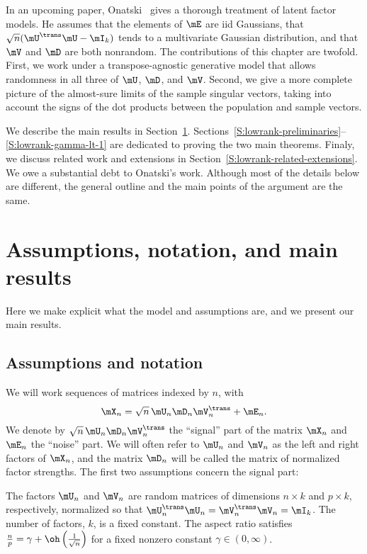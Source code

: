 In an upcoming paper, Onatski~\cite{onatski2009} gives a thorough
treatment of latent factor models. He assumes that the elements of $\mE$ are iid
Gaussians, that $\sqrt{n} ( \mU^\trans \mU - \mI_k) $ tends to a multivariate
Gaussian distribution, and that $\mV$ and $\mD$ are both nonrandom. The
contributions of this chapter are twofold. First, we work under a
transpose-agnostic generative model that allows randomness in all three of
$\mU$, $\mD$, and $\mV$. Second, we give a more complete picture of the
almost-sure limits of the sample singular vectors, taking into account the
signs of the dot products between the population and sample vectors.

We describe the main results in Section~\ref{S:lowrank-assumptions-results}.
Sections~\ref{S:lowrank-preliminaries}--\ref{S:lowrank-gamma-lt-1} are dedicated to proving the two main theorems.  Finaly, we discuss related work and extensions in Section~\ref{S:lowrank-related-extensions}.  We owe a substantial debt to Onatski's work.  Although most of the details below are different, the general outline and the main points of the argument are the same.

\section{Assumptions, notation, and main results}\label{S:lowrank-assumptions-results}

Here we make explicit what the model and assumptions are, and we present our
main results.

\subsection{Assumptions and notation}

We will work sequences of matrices indexed by $n$, with
\begin{equation}
    \mX_n = \sqrt{n} \, \mU_n \mD_n \mV_n^\trans + \mE_n.
\end{equation}
We denote by $\sqrt{n} \, \mU_n \mD_n \mV_n^\trans$ the ``signal'' part of the
matrix $\mX_n$ and $\mE_n$ the ``noise'' part. We will often refer to $\mU_n$
and $\mV_n$ as the left and right factors of $\mX_n$, and the matrix $\mD_n$
will be called the matrix of normalized factor strengths. The first two
assumptions concern the signal part:

\begin{assumption}\label{A:factors}
    The factors $\mU_n$ and $\mV_n$ are random matrices of dimensions
    $n \times k$ and $p \times k$, respectively, normalized so that
    $\mU_n^\trans \mU_n =  \mV_n^\trans \mV_n = \mI_k$. 
    The number of factors, $k$, is a fixed constant.  The aspect ratio
    satisfies $\frac{n}{p} = \gamma + \oh\left( \frac{1}{\sqrt{n}} \right)$
    for a fixed nonzero constant $\gamma \in (0,\infty)$.
\end{assumption}
\noindent

